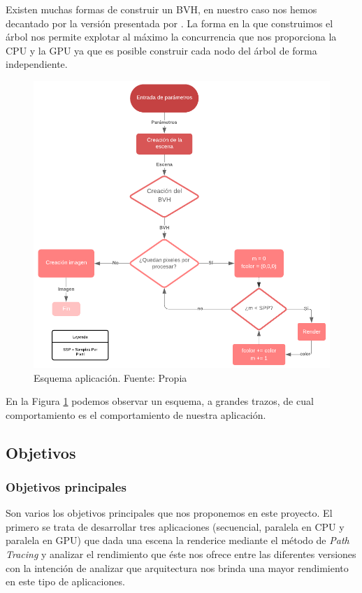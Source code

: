\documentclass[titlepage,12pt]{report}
\begin{document}
Existen muchas formas de construir un BVH, en nuestro caso nos hemos decantado por la versión presentada por \citep{Karras2012, Karras2013}. La forma en la que construimos el árbol nos permite explotar al máximo la concurrencia que nos proporciona la CPU y la GPU ya que es posible construir cada nodo del árbol de forma independiente.

\begin{figure}[ht]
	\centering
	\includegraphics[scale=0.35]{media/Esquema.png}
	\caption{Esquema aplicación. Fuente: Propia}
	\label{Esquema}
\end{figure}

En la Figura \ref{Esquema} podemos observar un esquema, a grandes trazos, de cual comportamiento es el comportamiento de nuestra aplicación.

\subsection{Objetivos}

\subsubsection{Objetivos principales}

Son varios los objetivos principales que nos proponemos en este proyecto. El primero se trata de desarrollar tres aplicaciones (secuencial, paralela en CPU y paralela en GPU) que dada una escena la renderice mediante el método de \textit{Path Tracing} y analizar el rendimiento que éste nos ofrece entre las diferentes versiones con la intención de analizar que arquitectura nos brinda una mayor rendimiento en este tipo de aplicaciones.
\end{document}
